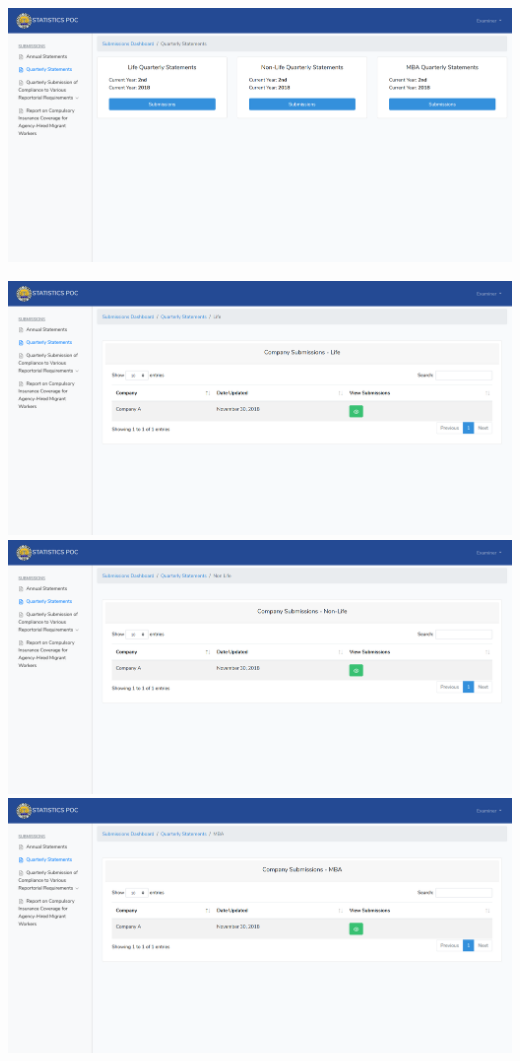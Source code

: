 \documentclass{article}
\begin{document}
\includegraphics[keepaspectratio=true]{up-ic-screens/image62}{}%

\includegraphics[keepaspectratio=true]{up-ic-screens/image33}{}\includegraphics[keepaspectratio=true]{up-ic-screens/image58}{}\includegraphics[keepaspectratio=true]{up-ic-screens/image137}{}%
\end{document}
